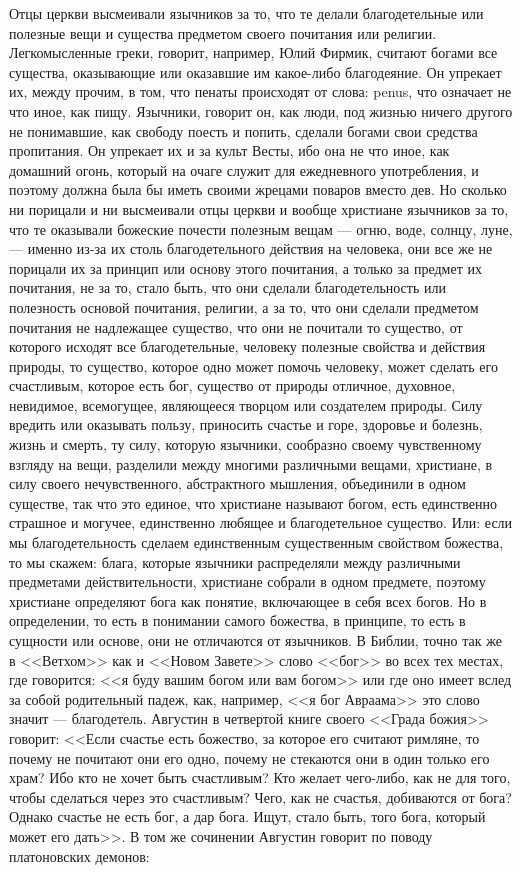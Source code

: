 \documentclass[12pt]{article}
\begin{document}
Отцы церкви высмеивали язычников за то, что те делали благодетельные или полезные вещи и существа предметом своего почитания или религии. Легкомысленные греки, говорит, например, Юлий Фирмик, считают богами все существа, оказывающие или оказавшие им какое-либо благодеяние. Он упрекает их, между прочим, в том, что пенаты происходят от слова: penus, что означает не что иное, как пищу. Язычники, говорит он, как люди, под жизнью ничего другого не понимавшие, как свободу поесть и попить, сделали богами свои средства пропитания. Он упрекает их и за культ Весты, ибо она не что иное, как домашний огонь, который на очаге служит для ежедневного употребления, и поэтому должна была бы иметь своими жрецами поваров вместо дев. Но сколько ни порицали и ни высмеивали отцы церкви и вообще христиане язычников за то, что те оказывали божеские почести полезным вещам --- огню, воде, солнцу, луне, --- именно из-за их столь благодетельного действия на человека, они все же не порицали их за принцип или основу этого почитания, а только за предмет их почитания, не за то, стало быть, что они сделали благодетельность или полезность основой почитания, религии, а за то, что они сделали предметом почитания не надлежащее существо, что они не почитали то существо, от которого исходят все благодетельные, человеку полезные свойства и действия природы, то существо, которое одно может помочь человеку, может сделать его счастливым, которое есть бог, существо от природы отличное, духовное, невидимое, всемогущее, являющееся творцом или создателем природы. Силу вредить или оказывать пользу, приносить счастье и горе, здоровье и болезнь, жизнь и смерть, ту силу, которую язычники, сообразно своему чувственному взгляду на вещи, разделили между многими различными вещами, христиане, в силу своего нечувственного, абстрактного мышления, объединили в одном существе, так что это единое, что христиане называют богом, есть единственно страшное и могучее, единственно любящее и благодетельное существо. Или: если мы благодетельность сделаем единственным существенным свойством божества, то мы скажем: блага, которые язычники распределяли между различными предметами действительности, христиане собрали в одном предмете, поэтому христиане определяют бога как понятие, включающее в себя всех богов. Но в определении, то есть в понимании самого божества, в принципе, то есть в сущности или основе, они не отличаются от язычников. В Библии, точно так же в <<Ветхом>>  как и <<Новом Завете>>  слово <<бог>> во всех тех местах, где говорится: <<я буду вашим богом или вам богом>> или где оно имеет вслед за собой родительный падеж, как, например, <<я бог Авраама>>  это слово значит --- благодетель. Августин в четвертой книге своего <<Града божия>> говорит: <<Если счастье есть божество, за которое его считают римляне, то почему не почитают они его одно, почему не стекаются они в один только его храм? Ибо кто не хочет быть счастливым? Кто желает чего-либо, как не для того, чтобы сделаться через это счастливым? Чего, как не счастья, добиваются от бога? Однако счастье не есть бог, а дар бога. Ищут, стало быть, того бога, который может его дать>>. В том же сочинении Августин говорит по поводу платоновских демонов: 
\end{document}
